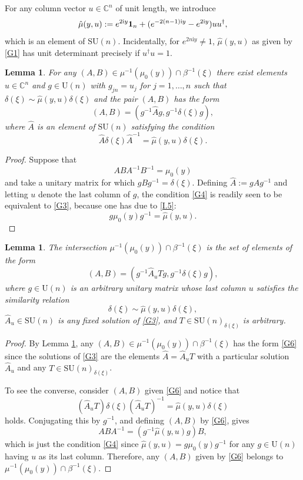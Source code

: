 \documentclass[a4paper,11pt,reqno]{amsart}
\newtheorem{lem}[thm]{Lemma}
\theoremstyle{definition}
\numberwithin{equation}{section}
\newcommand{\be}{\begin{equation}}
\newcommand{\ee}{\end{equation}}
\def\ri{{\mathrm{i}}}                       %
\def\1{{\mbox{\boldmath $1$}}}              %
\def\bC{{\mathbb C}}                        %
\def\SU{\mathrm{SU}}                        %
\def\U{\mathrm{U}}                          %
\begin{document}
For any column vector $u\in \bC^n$ of unit length, we introduce
\be
\hat \mu(y,u):= e^{2\ri y}\1_n + (e^{-2(n-1) \ri y} - e^{2\ri y}) u u^\dagger,
\label{G1}\ee
which is an element of $\SU(n)$.
Incidentally, for $e^{2n \ri y}\neq 1$,  $\hat \mu(y,u)$ as given by \eqref{G1}  has unit determinant precisely if $u^\dagger u =1$.

\begin{lem}\label{lemG1}
For any $(A,B) \in \mu^{-1}(\mu_0(y)) \cap \beta^{-1}(\xi)$ there exist elements $u\in \bC^n$ and $g\in \U(n)$ with $g_{jn}=u_j$ for $j=1,\dots, n$ such that
$\delta(\xi) \sim \hat \mu(y,u) \delta(\xi)$ and the pair $(A,B)$ has the form
\be
(A,B) =( g^{-1} \hat A g , g^{-1} \delta(\xi) g),
\label{G2}\ee
where $\hat A$ is an element of $\SU(n)$ satisfying the condition
\be
\hat A \delta(\xi) \hat A^{-1} = \hat \mu(y,u) \delta(\xi).
\label{G3}\ee
\end{lem}
\begin{proof}
Suppose that
\be
AB A^{-1} B^{-1} = \mu_0(y)
\label{G4}\ee
and
 take a unitary matrix for which $g B g^{-1} = \delta(\xi)$. Defining $\hat A := g A g^{-1}$ and letting $u$ denote the last column of $g$,
 the condition \eqref{G4} is readily seen to be equivalent to \eqref{G3}, because one has due to \eqref{I.5}:
 \be
 g \mu_0(y) g^{-1}  = \hat \mu(y,u).
 \label{G5}\ee
 \end{proof}

\begin{lem}\label{lemG2}
The intersection  $\mu^{-1}(\mu_0(y))\cap \beta^{-1}(\xi)$ is the set of elements of the form
\be
(A,B) = (g^{-1} \hat A_u T g, g^{-1} \delta(\xi) g),
\label{G6}\ee
where $g\in \U(n)$ is an arbitrary unitary matrix whose last column $u$ satisfies the similarity relation
\be
\delta(\xi) \sim \hat \mu(y,u) \delta(\xi),
\label{G7}\ee
$\hat A_u \in \SU(n)$ is any fixed solution of \eqref{G3},
and $T\in \SU(n)_{\delta(\xi)}$ is arbitrary.
\end{lem}
\begin{proof}
By Lemma \ref{lemG1}, any $(A,B)\in \mu^{-1}(\mu_0(y))\cap \beta^{-1}(\xi)$ has the form \eqref{G6} since the solutions
of \eqref{G3} are the elements $\hat A = \hat A_u T$ with a particular solution $\hat A_u$ and any $T\in \SU(n)_{\delta(\xi)}$.

To see the converse, consider $(A,B)$ given \eqref{G6} and notice that
\be
 (\hat A_u T) \delta(\xi) (\hat A_u T)^{-1} = \hat \mu(y,u) \delta(\xi)
 \label{G8}\ee
 holds. Conjugating this by $g^{-1}$, and defining $(A,B)$ by \eqref{G6},  gives
 \be
 A B A^{-1} = (g^{-1} \hat \mu(y,u) g) B,
 \label{G9}\ee
 which is just the condition \eqref{G4} since $\hat \mu(y,u) = g \mu_0(y) g^{-1}$ for any $g\in \U(n)$ having $u$ as
 its last column. Therefore, any $(A,B)$ given by \eqref{G6} belongs to $\mu^{-1}(\mu_0(y))\cap \beta^{-1}(\xi)$.
 \end{proof}
\end{document}
